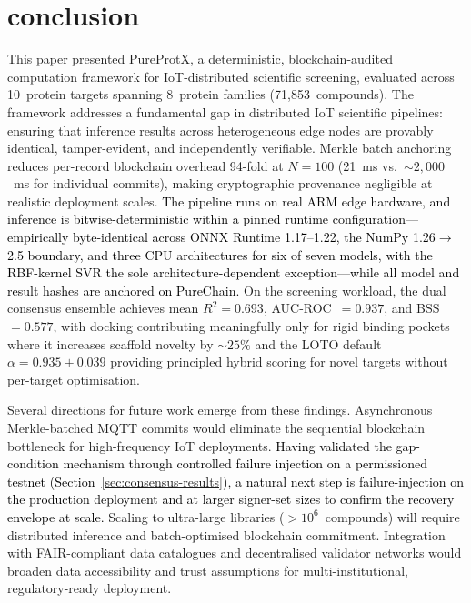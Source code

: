 \documentclass[conference]{IEEEtran}
\begin{document}
\section{\textbf{conclusion}}
\label{sec:conclusion}

This paper presented PureProtX, a deterministic,
blockchain-audited computation framework for IoT-distributed
scientific screening, evaluated across 10~protein targets
spanning 8~protein families (71{,}853~compounds).
The framework addresses a fundamental gap in distributed
IoT scientific pipelines: ensuring that inference results
across heterogeneous edge nodes are provably identical,
tamper-evident, and independently verifiable.
Merkle batch anchoring reduces per-record blockchain overhead
94-fold at $N{=}100$ (21~ms vs.\ ${\sim}2{,}000$~ms for
individual commits), making cryptographic provenance
negligible at realistic deployment scales.
\textcolor{black}{The pipeline runs on real ARM edge hardware,
and inference is bitwise-deterministic within a pinned
runtime configuration---empirically byte-identical across
ONNX Runtime 1.17--1.22, the NumPy 1.26$\rightarrow$2.5
boundary, and three CPU architectures for six of seven
models, with the RBF-kernel SVR the sole
architecture-dependent exception---while all model and result
hashes are anchored on PureChain.}
On the screening workload, the dual consensus ensemble
achieves mean $R^2{=}0.693$, AUC-ROC~$=0.937$, and
BSS~$=0.577$, with docking contributing meaningfully only
for rigid binding pockets where it increases scaffold
novelty by ${\sim}25\%$ and the LOTO default
$\alpha{=}0.935{\pm}0.039$ providing principled hybrid
scoring for novel targets without per-target optimisation.

Several directions for future work emerge from these
findings.
Asynchronous Merkle-batched MQTT commits would eliminate
the sequential blockchain bottleneck for high-frequency
IoT deployments.
\textcolor{black}{Having validated the gap-condition mechanism through
controlled failure injection on a permissioned testnet
(Section~\ref{sec:consensus-results}), a natural next step
is failure-injection on the production deployment and at
larger signer-set sizes to confirm the recovery envelope
at scale.}
Scaling to ultra-large libraries ($>10^6$~compounds) will
require distributed inference and batch-optimised
blockchain commitment.
Integration with FAIR-compliant data catalogues and
decentralised validator networks would broaden data
accessibility and trust assumptions for multi-institutional,
regulatory-ready deployment.
\end{document}
